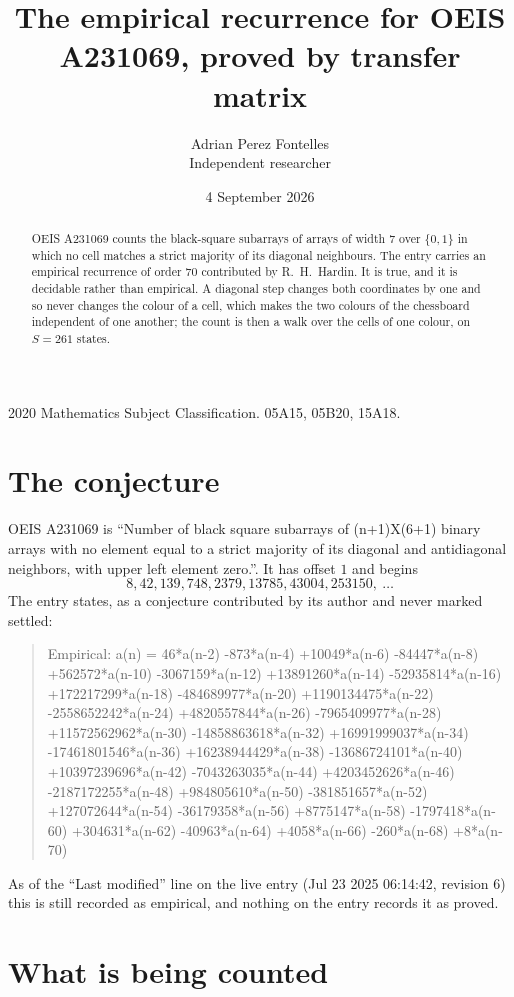 \documentclass[11pt,a4paper]{article}
\title{The empirical recurrence for OEIS A231069, proved by transfer matrix}
\author{Adrian Perez Fontelles\\ \small Independent researcher}
\date{4 September 2026}
\theoremstyle{plain}
\theoremstyle{definition}
\begin{document}
\maketitle

\begin{abstract}
OEIS A231069 counts the black-square subarrays of arrays of width $7$ over $\{0,1\}$ in which
no cell matches a strict majority of its diagonal neighbours. The entry carries an empirical recurrence of order $70$ contributed by
R.~H.~Hardin. It is true, and it is decidable rather than empirical. A diagonal step changes
both coordinates by one and so never changes the colour of a cell, which makes the two colours
of the chessboard independent of one another; the count is then a walk over the cells of one
colour, on $S=261$ states.
\end{abstract}

\noindent\small 2020 Mathematics Subject Classification. 05A15, 05B20, 15A18.\normalsize

\section{The conjecture}

OEIS A231069 is ``Number of black square subarrays of (n+1)X(6+1) binary arrays with no element equal to a strict majority of its diagonal and antidiagonal neighbors, with upper left element zero.''. It has offset $1$ and begins
\[
8, 42, 139, 748, 2379, 13785, 43004, 253150,\ \dots
\]
The entry states, as a conjecture contributed by its author and never marked settled:
\begin{quote}
Empirical: a(n) = 46*a(n-2) -873*a(n-4) +10049*a(n-6) -84447*a(n-8) +562572*a(n-10) -3067159*a(n-12) +13891260*a(n-14) -52935814*a(n-16) +172217299*a(n-18) -484689977*a(n-20) +1190134475*a(n-22) -2558652242*a(n-24) +4820557844*a(n-26) -7965409977*a(n-28) +11572562962*a(n-30) -14858863618*a(n-32) +16991999037*a(n-34) -17461801546*a(n-36) +16238944429*a(n-38) -13686724101*a(n-40) +10397239696*a(n-42) -7043263035*a(n-44) +4203452626*a(n-46) -2187172255*a(n-48) +984805610*a(n-50) -381851657*a(n-52) +127072644*a(n-54) -36179358*a(n-56) +8775147*a(n-58) -1797418*a(n-60) +304631*a(n-62) -40963*a(n-64) +4058*a(n-66) -260*a(n-68) +8*a(n-70)
\end{quote}
As of the ``Last modified'' line on the live entry (Jul 23 2025 06:14:42, revision 6) this is still
recorded as empirical, and nothing on the entry records it as proved.

\section{What is being counted}
\end{document}
